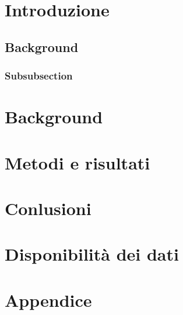 \section{Introduzione}
\lipsum[1-2]
\subsection{Background}



\subsubsection{Subsubsection}
\lipsum[1-2]
\section{Background}
\lipsum[1-5]
\section{Metodi e risultati}

\lipsum[1-5]

\section{Conlusioni}
\lipsum[1-5]

\section*{Disponibilità dei dati}


\printbibliography[title=Riferimenti]
\pagebreak
\appendix
\section*{Appendice}
\lipsum[1-5]